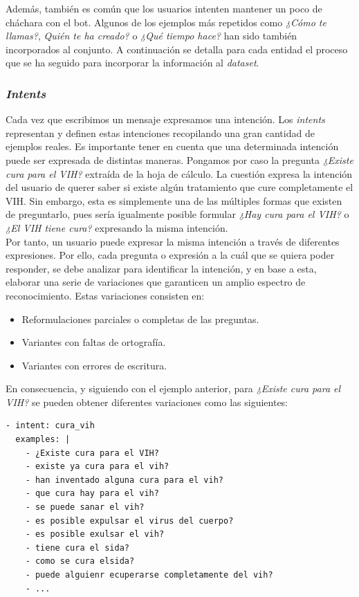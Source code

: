 Además, también es común que los usuarios intenten mantener un poco de cháchara con el bot. Algunos de los ejemplos más repetidos como \textit{¿Cómo te llamas?}, \textit{Quién te ha creado?} o \textit{¿Qué tiempo hace?} han sido también incorporados al conjunto. A continuación se detalla para cada entidad el proceso que se ha seguido para incorporar la información al \textit{dataset}.\\

\subsubsection{\textit{Intents}}
Cada vez que escribimos un mensaje expresamos una intención. Los \textit{intents} representan y definen estas intenciones recopilando una gran cantidad de ejemplos reales. Es importante tener en cuenta que una determinada intención puede ser expresada de distintas maneras. Pongamos por caso la pregunta  \textit{¿Existe cura para el VIH?} extraída de la hoja de cálculo. La cuestión expresa la intención del usuario de querer saber si existe algún tratamiento que cure completamente el VIH. Sin embargo, esta es simplemente una  de las múltiples formas que existen de preguntarlo, pues sería igualmente posible formular \textit{¿Hay cura para el VIH?} o \textit{¿El VIH tiene cura?} expresando la misma intención.\\

Por tanto, un usuario puede expresar la misma intención a través de diferentes expresiones. Por ello, cada pregunta o expresión a la cuál que se quiera poder responder, se debe analizar para identificar la intención, y en base a esta, elaborar una serie de variaciones que garanticen un amplio espectro de reconocimiento.
Estas variaciones consisten en:

\begin{itemize}
	\item Reformulaciones parciales o completas de las preguntas.
	\item Variantes con faltas de ortografía.
	\item Variantes con errores de escritura.
\end{itemize}

En consecuencia, y siguiendo con el ejemplo anterior, para \textit{¿Existe cura para el VIH?} se pueden obtener diferentes variaciones como las siguientes:

\begin{verbatim}
- intent: cura_vih
  examples: |
    - ¿Existe cura para el VIH?
    - existe ya cura para el vih?
    - han inventado alguna cura para el vih?
    - que cura hay para el vih?
    - se puede sanar el vih?
    - es posible expulsar el virus del cuerpo?
    - es posible exulsar el vih?
    - tiene cura el sida?
    - como se cura elsida?
    - puede alguienr ecuperarse completamente del vih?
    - ...
\end{verbatim}

